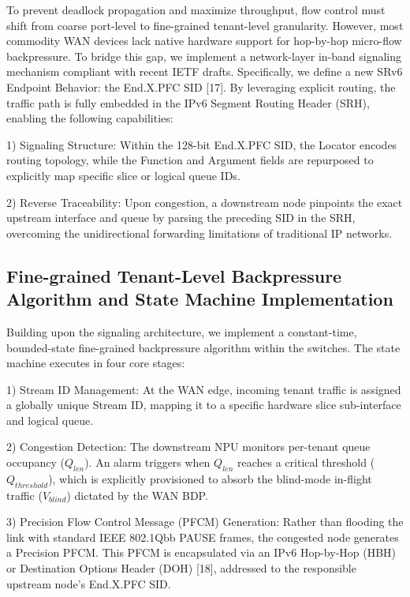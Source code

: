 \documentclass[a4paper]{jpconf}
\begin{document}
To prevent deadlock propagation and maximize throughput, flow control must shift from coarse port-level to fine-grained tenant-level granularity. However, most commodity WAN devices lack native hardware support for hop-by-hop micro-flow backpressure. To bridge this gap, we implement a network-layer in-band signaling mechanism compliant with recent IETF drafts. Specifically, we define a new SRv6 Endpoint Behavior: the End.X.PFC SID [17]. By leveraging explicit routing, the traffic path is fully embedded in the IPv6 Segment Routing Header (SRH), enabling the following capabilities:


1) Signaling Structure: Within the 128-bit End.X.PFC SID, the Locator encodes routing topology, while the Function and Argument fields are repurposed to explicitly map specific slice or logical queue IDs.


2) Reverse Traceability: Upon congestion, a downstream node pinpoints the exact upstream interface and queue by parsing the preceding SID in the SRH, overcoming the unidirectional forwarding limitations of traditional IP networks.


\subsection{Fine-grained Tenant-Level Backpressure Algorithm and State Machine Implementation}


Building upon the signaling architecture, we implement a constant-time, bounded-state fine-grained backpressure algorithm within the switches. The state machine executes in four core stages:


1) Stream ID Management: At the WAN edge, incoming tenant traffic is assigned a globally unique Stream ID, mapping it to a specific hardware slice sub-interface and logical queue.


2) Congestion Detection: The downstream NPU monitors per-tenant queue occupancy ($Q_{len}$). An alarm triggers when $Q_{len}$ reaches a critical threshold ($Q_{threshold}$), which is explicitly provisioned to absorb the blind-mode in-flight traffic ($V_{blind}$) dictated by the WAN BDP.


3) Precision Flow Control Message (PFCM) Generation: Rather than flooding the link with standard IEEE 802.1Qbb PAUSE frames, the congested node generates a Precision PFCM. This PFCM is encapsulated via an IPv6 Hop-by-Hop (HBH) or Destination Options Header (DOH) [18], addressed to the responsible upstream node's End.X.PFC SID.
\end{document}

